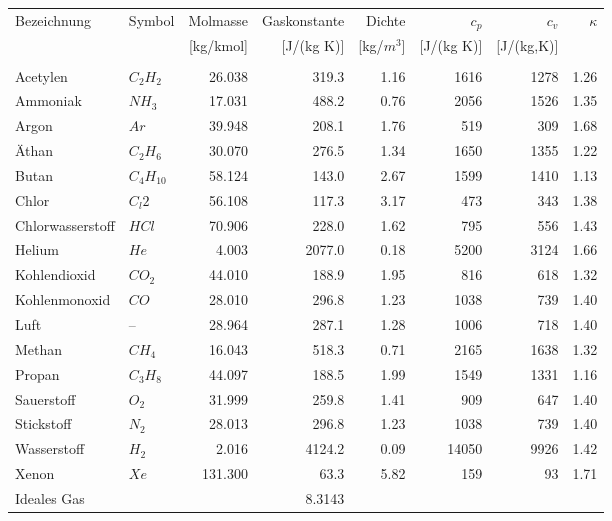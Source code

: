 \documentclass[twocolumn]{article}
\begin{document}
\begin{center}

\begin{tabular}{l|l|r|r|r|r|r|r}
Bezeichnung	&	Symbol	&Molmasse 	&Gaskonstante	&	Dichte	& $c_p$ & $c_v$ &$\kappa$ \\
		&		&[kg/kmol]	&[J/(kg K)]	& 	[kg/$m^3$]	& [J/(kg K)]	& [J/(kg,K)] & \\
	&&&&&&\\
Acetylen	&$	C_2H_2	$&	26.038	&	319.3	&	1.16 	&	1616	&	1278	&	1.26 \\
Ammoniak	&$	NH_3	$&	17.031	&	488.2	&	0.76 	&	2056	&	1526	&	1.35 \\
Argon		&$	Ar	$&	39.948	&	208.1	&	1.76 	&	519	&	309	&	1.68 \\
Äthan		&$	C_2H_6	$&	30.070	&	276.5	&	1.34 	&	1650	&	1355	&	1.22 \\
Butan		&$	C_4H_10	$&	58.124	&	143.0	&	2.67 	&	1599	&	1410	&	1.13 \\
Chlor		&$	C_l2	$&	56.108	&	117.3	&	3.17 	&	473	&	343	&	1.38 \\
Chlorwasserstoff&$	HCl	$&	70.906	&	228.0	&	1.62 	&	795	&	556	&	1.43 \\
Helium		&$	He	$&	4.003	&	2077.0	&	0.18 	&	5200	&	3124	&	1.66 \\
Kohlendioxid	&$	CO_2	$&	44.010	&	188.9	&	1.95 	&	816	&	618	&	1.32 \\
Kohlenmonoxid	&$	CO	$&	28.010	&	296.8	&	1.23 	&	1038	&	739	&	1.40 \\
Luft		&--		&	28.964	&	287.1	&	1.28 	&	1006	&	718	&	1.40 \\
Methan		&$	CH_4	$&	16.043	&	518.3	&	0.71 	&	2165	&	1638	&	1.32 \\
Propan		&$	C_3H_8	$&	44.097	&	188.5	&	1.99 	&	1549	&	1331	&	1.16 \\
Sauerstoff	&$	O_2	$&	31.999	&	259.8	&	1.41 	&	909	&	647	&	1.40 \\
Stickstoff	&$	N_2	$&	28.013	&	296.8	&	1.23 	&	1038	&	739	&	1.40 \\
Wasserstoff	&$	H_2	$&	2.016	&	4124.2	&	0.09 	&	14050	&	9926	&	1.42 \\
Xenon		&$	Xe	$&	131.300	&	63.3	&	5.82 	&	159	&	93	&	1.71 \\
Ideales Gas	&		 &		&	8.3143	&		&		&
\end{tabular}

\end{center}
%										                                  
%
\end{document}
